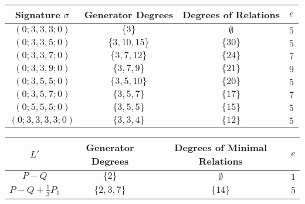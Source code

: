 \documentclass[a0,landscape]{a0poster}
\newcommand{\halfcan}{L}
\theoremstyle{definition}
\begin{document}
\begin{multicols}{3}
\begin{minipage}{38cm}
\centering

\begin{tabular}
	{| c || c | c | c |}
	\hline
	Signature $\sigma$ & Generator Degrees & Degrees of Relations & $e$ \\
	\hline
	\hline

	$(0; 3, 3, 3; 0)$ & $\{3\}$ & $\emptyset$ & $5$ \\	\hline

	$(0; 3, 3, 5; 0)$ & $\{3, 10, 15\}$ & $\{30\}$ & $5$ \\	\hline
	
	$(0; 3, 3, 7; 0)$ & $\{3, 7, 12\}$ & $\{24\}$ & $7$ \\	\hline
	
	$(0; 3, 3, 9; 0)$ & $\{3, 7, 9\}$ & $\{21\}$ & $9$ \\	\hline
	
	$(0; 3, 5, 5; 0)$ & $\{3, 5, 10\}$ & $\{20\}$ & $5$ \\	\hline
	
	$(0; 3, 5, 7; 0)$ & $\{3, 5, 7\}$ & $\{17\}$ & $7$ \\	\hline
	
	$(0; 5, 5, 5; 0)$ & $\{3, 5, 5\}$ & $\{15\}$ & $5$ \\	\hline
	
	$(0; 3, 3, 3, 3; 0)$ & $\{3, 3, 4\}$ & $\{12\}$ & $5$ \\	\hline
\end{tabular}


\label{table:g-0-exceptional}
\end{minipage}


\begin{minipage}{38cm}
\centering




\begin{center}
\begin{tabular}
{| c || c | c | c |}
	\hline
	$\halfcan'$ & Generator Degrees & Degrees of Minimal Relations & $e$ \\
	\hline
	\hline
	$P - Q$ & $\{2\}$ & $\emptyset$ & $1$\\	\hline

	$P - Q + \frac{1}{3} P_1$ & $\{2, 3, 7\}$ & $\{14\}$ & $5$ \\	\hline


\end{tabular}
\end{center}
\end{minipage}
\end{multicols}
\end{document}
